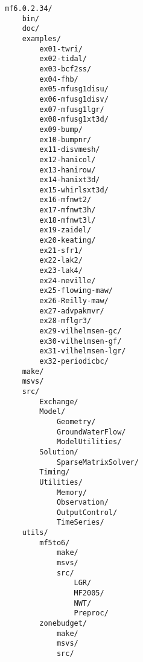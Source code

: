 \begin{verbatim}
mf6.0.2.34/ 
    bin/ 
    doc/ 
    examples/ 
        ex01-twri/ 
        ex02-tidal/ 
        ex03-bcf2ss/ 
        ex04-fhb/ 
        ex05-mfusg1disu/ 
        ex06-mfusg1disv/ 
        ex07-mfusg1lgr/ 
        ex08-mfusg1xt3d/ 
        ex09-bump/ 
        ex10-bumpnr/ 
        ex11-disvmesh/ 
        ex12-hanicol/ 
        ex13-hanirow/ 
        ex14-hanixt3d/ 
        ex15-whirlsxt3d/ 
        ex16-mfnwt2/ 
        ex17-mfnwt3h/ 
        ex18-mfnwt3l/ 
        ex19-zaidel/ 
        ex20-keating/ 
        ex21-sfr1/ 
        ex22-lak2/ 
        ex23-lak4/ 
        ex24-neville/ 
        ex25-flowing-maw/ 
        ex26-Reilly-maw/ 
        ex27-advpakmvr/ 
        ex28-mflgr3/ 
        ex29-vilhelmsen-gc/ 
        ex30-vilhelmsen-gf/ 
        ex31-vilhelmsen-lgr/ 
        ex32-periodicbc/ 
    make/ 
    msvs/ 
    src/ 
        Exchange/ 
        Model/ 
            Geometry/ 
            GroundWaterFlow/ 
            ModelUtilities/ 
        Solution/ 
            SparseMatrixSolver/ 
        Timing/ 
        Utilities/ 
            Memory/ 
            Observation/ 
            OutputControl/ 
            TimeSeries/ 
    utils/ 
        mf5to6/ 
            make/ 
            msvs/ 
            src/ 
                LGR/ 
                MF2005/ 
                NWT/ 
                Preproc/ 
        zonebudget/ 
            make/ 
            msvs/ 
            src/ 
\end{verbatim}
